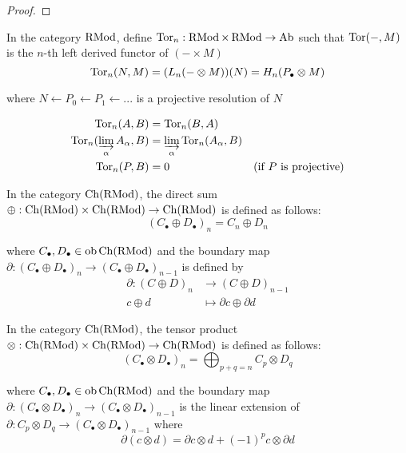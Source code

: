 \begin{proof}
\end{proof}

\begin{definition}
	In the category $\operatorname{RMod}$, define $\operatorname{Tor}_n: \operatorname{RMod} \times \operatorname{RMod} \to \operatorname{Ab}$ such that $\operatorname{Tor}(-, M)$ is the $n$-th left derived functor of $(- \times M)$
	$$
	\operatorname{Tor}_n(N, M) = (L_n (- \otimes M))(N) = H_n(P_\bullet \otimes M)
	$$
	
	where $N \leftarrow P_0 \leftarrow P_1 \leftarrow ...$ is a projective resolution of $N$
\end{definition}

\begin{remark}
	\begin{align*}
		\operatorname{Tor}_n(A, B) &= \operatorname{Tor}_n(B, A) \\
		\operatorname{Tor}_n (\varinjlim_\alpha A_\alpha, B) &= \varinjlim_\alpha \operatorname{Tor}_n (A_\alpha, B) \\
		\operatorname{Tor}_n(P, B) &= 0 &\text{(if $P$ is projective)} \\
	\end{align*}
\end{remark}

\begin{definition}
	In the category $\operatorname{Ch}(\operatorname{RMod})$, the direct sum $\oplus: \operatorname{Ch}(\operatorname{RMod}) \times \operatorname{Ch}(\operatorname{RMod}) \to \operatorname{Ch}(\operatorname{RMod})$ is defined as follows:
	$$
	(C_\bullet \oplus D_\bullet)_n = C_n \oplus D_n
	$$
	
	where $C_\bullet, D_\bullet \in \operatorname{ob} \operatorname{Ch}(\operatorname{RMod})$ and the boundary map $\partial: (C_\bullet \oplus D_\bullet)_n \to (C_\bullet \oplus D_\bullet)_{n-1}$ is defined by
	\begin{align*}
		\partial:   (C \oplus D)_n &\to (C \oplus D)_{n-1} \\
		c \oplus d &\mapsto \partial c \oplus \partial d
	\end{align*}
	
\end{definition}

\begin{definition}
	In the category $\operatorname{Ch}(\operatorname{RMod})$, the tensor product $\otimes: \operatorname{Ch}(\operatorname{RMod}) \times \operatorname{Ch}(\operatorname{RMod}) \to \operatorname{Ch}(\operatorname{RMod})$ is defined as follows:
	$$
	(C_\bullet \otimes D_\bullet)_n = \bigoplus_{p + q = n} C_p \otimes D_q
	$$
	
	where $C_\bullet, D_\bullet \in \operatorname{ob} \operatorname{Ch}(\operatorname{RMod})$ and the boundary map $\partial: (C_\bullet \otimes D_\bullet)_n \to (C_\bullet \otimes D_\bullet)_{n-1}$ is the linear extension of $\partial: C_p \otimes D_q \to (C_\bullet \otimes D_\bullet)_{n-1}$ where
	$$
	\partial (c \otimes d) = \partial c \otimes d + (-1)^{p} c \otimes \partial d
	$$
\end{definition}

